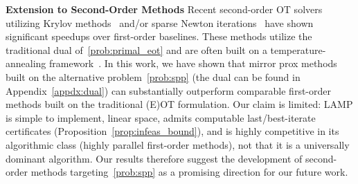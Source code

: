 \documentclass[10pt]{article}
\theoremstyle{plain}
\theoremstyle{definition}
\theoremstyle{remark}
\begin{document}
\textbf{Extension to Second-Order Methods} Recent second-order OT solvers utilizing Krylov methods~\cite{kemertasTruncatedNewtonMethod2024,kemertasEfficientAccurateOptimal2025,wu2025pins} and/or sparse Newton iterations~\cite{wu2025pins,pan2026inexact} have shown significant speedups over first-order baselines. These methods utilize the traditional dual of~\eqref{prob:primal_eot} and are often built on a temperature-annealing framework~\cite{kemertasEfficientAccurateOptimal2025}. In this work, we have shown that mirror prox methods built on the alternative problem~\eqref{prob:spp} (the dual can be found in Appendix~\ref{appdx:dual}) can substantially outperform comparable first-order methods built on the traditional (E)OT formulation.  Our claim is limited: LAMP is simple to implement, linear space, admits computable last/best-iterate certificates (Proposition~\ref{prop:infeas_bound}), and is highly competitive in its algorithmic class (highly parallel first-order methods), not that it is a universally dominant algorithm. Our results therefore suggest the development of second-order methods targeting~\eqref{prob:spp} as a promising direction for our future work.



\appendix
\end{document}
